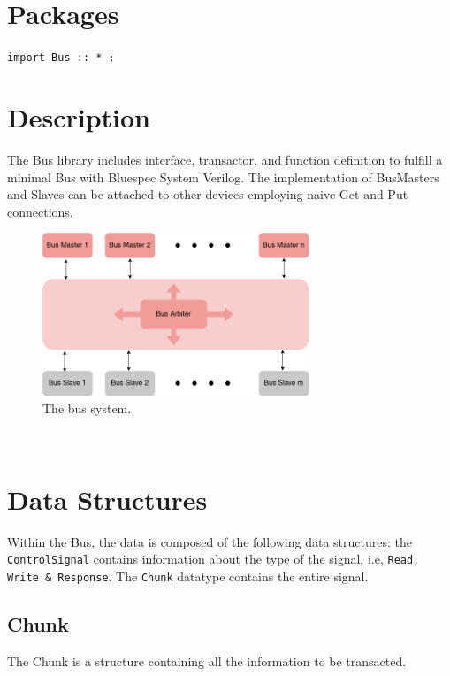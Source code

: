 \begin{paper}
\renewcommand*{\pagemark}{}

\section*{Packages\sdot}
\texttt{import Bus :: * ;}
\section*{Description\sdot}
The Bus library includes interface, transactor, and function definition to fulfill a minimal Bus with Bluespec System Verilog. The implementation of BusMasters and Slaves can be attached to other devices employing naive Get and Put connections.

\begin{figure}[H]
\centering
\includegraphics[width=8cm]{Images/Overview-Bus.png}
\caption{\content The bus system.}
\end{figure}\\


\section*{Data Structures\sdot}
Within the Bus, the data is composed of the following data structures: the \texttt{ControlSignal} contains information about the type of the signal, i.e, \texttt{Read, Write \& Response}. The \texttt{Chunk} datatype contains the entire signal.

\subsection*{Chunk\sdot}
The Chunk is a structure containing all the information to be transacted.


\end{paper}
